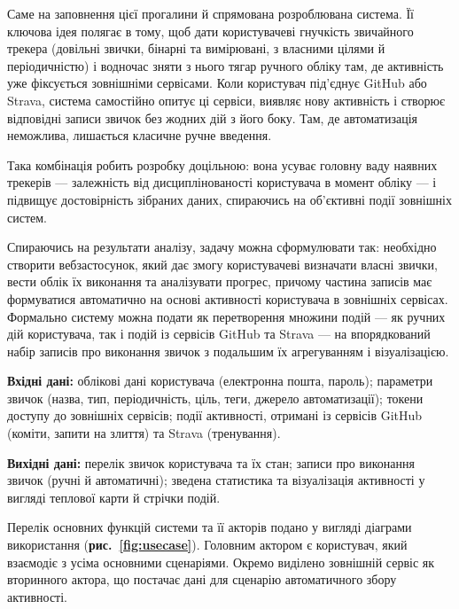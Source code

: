 Саме на заповнення цієї прогалини й спрямована розроблювана система. Її ключова ідея полягає в тому, щоб дати користувачеві гнучкість звичайного трекера (довільні звички, бінарні та вимірювані, з власними цілями й періодичністю) і водночас зняти з нього тягар ручного обліку там, де активність уже фіксується зовнішніми сервісами. Коли користувач під'єднує GitHub або Strava, система самостійно опитує ці сервіси, виявляє нову активність і створює відповідні записи звичок без жодних дій з його боку. Там, де автоматизація неможлива, лишається класичне ручне введення.

Така комбінація робить розробку доцільною: вона усуває головну ваду наявних трекерів — залежність від дисциплінованості користувача в момент обліку — і підвищує достовірність зібраних даних, спираючись на об'єктивні події зовнішніх систем.


Спираючись на результати аналізу, задачу можна сформулювати так: необхідно створити вебзастосунок, який дає змогу користувачеві визначати власні звички, вести облік їх виконання та аналізувати прогрес, причому частина записів має формуватися автоматично на основі активності користувача в зовнішніх сервісах. Формально систему можна подати як перетворення множини подій — як ручних дій користувача, так і подій із сервісів GitHub та Strava — на впорядкований набір записів про виконання звичок з подальшим їх агрегуванням і візуалізацією.

\textbf{Вхідні дані:} облікові дані користувача (електронна пошта, пароль); параметри звичок (назва, тип, періодичність, ціль, теги, джерело автоматизації); токени доступу до зовнішніх сервісів; події активності, отримані із сервісів GitHub (коміти, запити на злиття) та Strava (тренування).

\textbf{Вихідні дані:} перелік звичок користувача та їх стан; записи про виконання звичок (ручні й автоматичні); зведена статистика та візуалізація активності у вигляді теплової карти й стрічки подій.

Перелік основних функцій системи та її акторів подано у вигляді діаграми використання (\textbf{рис.~\ref{fig:usecase}}). Головним актором є користувач, який взаємодіє з усіма основними сценаріями. Окремо виділено зовнішній сервіс як вторинного актора, що постачає дані для сценарію автоматичного збору активності.


